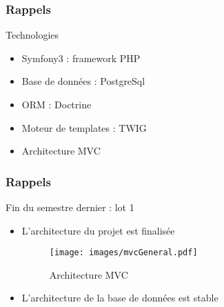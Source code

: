 \speaker{\Francois}

\begin{frame}
\frametitle{Rappels}
\begin{block}{Technologies}
	\begin{itemize}
		\item Symfony3 : framework PHP
		\item Base de données : PostgreSql
		\item ORM : Doctrine
		\item Moteur de templates : TWIG
		\vspace{.5cm}
		\item Architecture MVC
	\end{itemize}
\end{block}
\end{frame}

\begin{frame}
\frametitle{Rappels}
\begin{block}{Fin du semestre dernier : lot 1}
	\begin{itemize}
		\item L'architecture du projet est finalisée
		\begin{figure}[!h]
			\begin{center}
				\texttt{[image: images/mvcGeneral.pdf]}
				\caption{Architecture MVC}
			\end{center}
		\end{figure}
		\item L'architecture de la base de données est stable
	\end{itemize}
\end{block}
\end{frame}